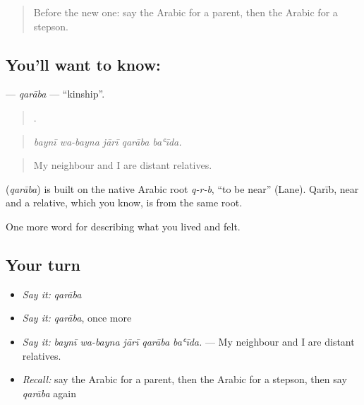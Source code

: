 \label{lesson:AR-C532-qaraba}



\begin{quote}
Before the new one: say the Arabic for a parent, then the Arabic for a stepson.
\end{quote}

\subsection*{You'll want to know: }
\textbf{} — \emph{qarāba} — \textquotedblleft{}kinship\textquotedblright{}.

\begin{quote}
    .
\end{quote}

\begin{quote}
\emph{baynī wa-bayna jārī qarāba baʿīda.}
\end{quote}

\begin{quote}
My neighbour and I are distant relatives.
\end{quote}

\begin{cousinweb}
\textbf{} (\emph{qarāba}) is built on the native Arabic root \emph{q-r-b}, \textquotedblleft{}to be near\textquotedblright{} (Lane). Qarīb, near and a relative, which you know, is from the same root.
\end{cousinweb}

\begin{grammarlens}[title={What you've built}]
One more word for describing what you lived and felt.
\end{grammarlens}

\subsection*{Your turn}
\begin{itemize}
\raggedright
  \item \emph{Say it:} \emph{qarāba}
  \item \emph{Say it:} \emph{qarāba}, once more
  \item \emph{Say it:} \emph{baynī wa-bayna jārī qarāba baʿīda.} — My neighbour and I are distant relatives.
  \item \emph{Recall:} say the Arabic for a parent, then the Arabic for a stepson, then say \emph{qarāba} again
\end{itemize}

